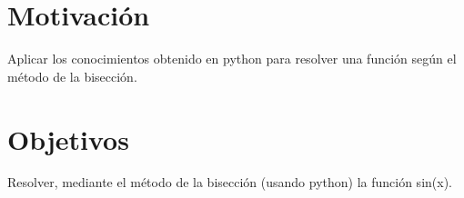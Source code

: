 

\section{Motivación}
\label{1:sec:1}
 Aplicar los conocimientos obtenido en python para resolver una función según el método de la bisección.

\section{Objetivos}
\label{1:sec:2}
 Resolver, mediante el método de la bisección (usando python) la función sin(x).



